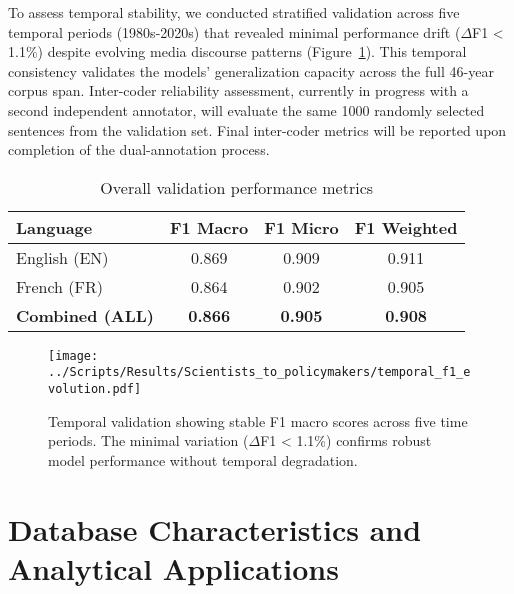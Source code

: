 \documentclass[12pt]{article}
\begin{document}
To assess temporal stability, we conducted stratified validation across five temporal periods (1980s-2020s) that revealed minimal performance drift ($\Delta$F1 < 1.1\%) despite evolving media discourse patterns (Figure~\ref{fig:temporal_validation}). This temporal consistency validates the models' generalization capacity across the full 46-year corpus span. Inter-coder reliability assessment, currently in progress with a second independent annotator, will evaluate the same 1000 randomly selected sentences from the validation set. Final inter-coder metrics will be reported upon completion of the dual-annotation process.


\begin{table}[h!]
\centering
\caption{Overall validation performance metrics}
\label{tab:final_validation_metrics}
\begin{tabular}{lccc}
\toprule
\textbf{Language} & \textbf{F1 Macro} & \textbf{F1 Micro} & \textbf{F1 Weighted} \\
\midrule
English (EN) & 0.869 & 0.909 & 0.911 \\
French (FR) & 0.864 & 0.902 & 0.905 \\
\midrule
\textbf{Combined (ALL)} & \textbf{0.866} & \textbf{0.905} & \textbf{0.908} \\
\bottomrule
\end{tabular}
\end{table}

\begin{figure}[h!]
\centering
\texttt{[image: ../Scripts/Results/Scientists\_to\_policymakers/temporal\_f1\_evolution.pdf]}
\caption{Temporal validation showing stable F1 macro scores across five time periods. The minimal variation ($\Delta$F1 < 1.1\%) confirms robust model performance without temporal degradation.}
\label{fig:temporal_validation}
\end{figure}

\section{Database Characteristics and Analytical Applications}
\end{document}
